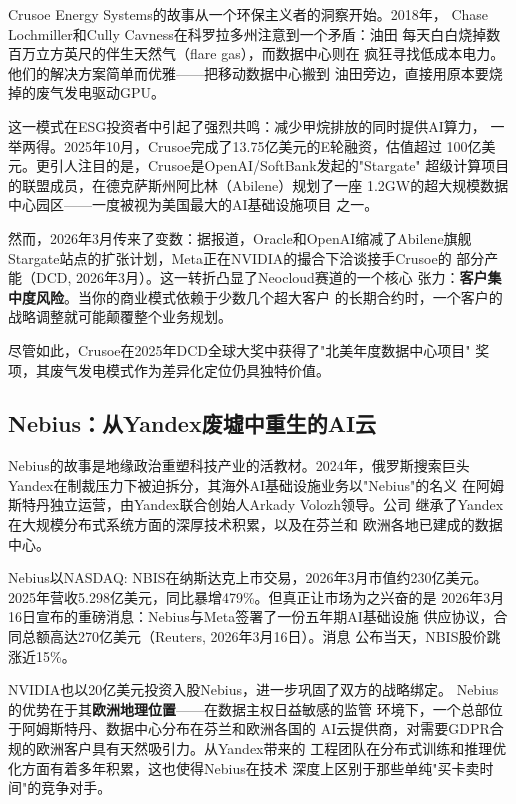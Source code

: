 Crusoe Energy Systems的故事从一个环保主义者的洞察开始。2018年，
Chase Lochmiller和Cully Cavness在科罗拉多州注意到一个矛盾：油田
每天白白烧掉数百万立方英尺的伴生天然气（flare gas），而数据中心则在
疯狂寻找低成本电力。他们的解决方案简单而优雅——把移动数据中心搬到
油田旁边，直接用原本要烧掉的废气发电驱动GPU。

这一模式在ESG投资者中引起了强烈共鸣：减少甲烷排放的同时提供AI算力，
一举两得。2025年10月，Crusoe完成了13.75亿美元的E轮融资，估值超过
100亿美元。更引人注目的是，Crusoe是OpenAI/SoftBank发起的"Stargate"
超级计算项目的联盟成员，在德克萨斯州阿比林（Abilene）规划了一座
1.2GW的超大规模数据中心园区——一度被视为美国最大的AI基础设施项目
之一。

然而，2026年3月传来了变数：据报道，Oracle和OpenAI缩减了Abilene旗舰
Stargate站点的扩张计划，Meta正在NVIDIA的撮合下洽谈接手Crusoe的
部分产能（DCD, 2026年3月）。这一转折凸显了Neocloud赛道的一个核心
张力：\textbf{客户集中度风险}。当你的商业模式依赖于少数几个超大客户
的长期合约时，一个客户的战略调整就可能颠覆整个业务规划。

尽管如此，Crusoe在2025年DCD全球大奖中获得了"北美年度数据中心项目"
奖项，其废气发电模式作为差异化定位仍具独特价值。

\subsection{Nebius：从Yandex废墟中重生的AI云}
\label{subsec:nebius}

Nebius的故事是地缘政治重塑科技产业的活教材。2024年，俄罗斯搜索巨头
Yandex在制裁压力下被迫拆分，其海外AI基础设施业务以"Nebius"的名义
在阿姆斯特丹独立运营，由Yandex联合创始人Arkady Volozh领导。公司
继承了Yandex在大规模分布式系统方面的深厚技术积累，以及在芬兰和
欧洲各地已建成的数据中心。

Nebius以NASDAQ: NBIS在纳斯达克上市交易，2026年3月市值约230亿美元。
2025年营收5.298亿美元，同比暴增479\%。但真正让市场为之兴奋的是
2026年3月16日宣布的重磅消息：Nebius与Meta签署了一份五年期AI基础设施
供应协议，合同总额高达270亿美元（Reuters, 2026年3月16日）。消息
公布当天，NBIS股价跳涨近15\%。

NVIDIA也以20亿美元投资入股Nebius，进一步巩固了双方的战略绑定。
Nebius的优势在于其\textbf{欧洲地理位置}——在数据主权日益敏感的监管
环境下，一个总部位于阿姆斯特丹、数据中心分布在芬兰和欧洲各国的
AI云提供商，对需要GDPR合规的欧洲客户具有天然吸引力。从Yandex带来的
工程团队在分布式训练和推理优化方面有着多年积累，这也使得Nebius在技术
深度上区别于那些单纯"买卡卖时间"的竞争对手。

